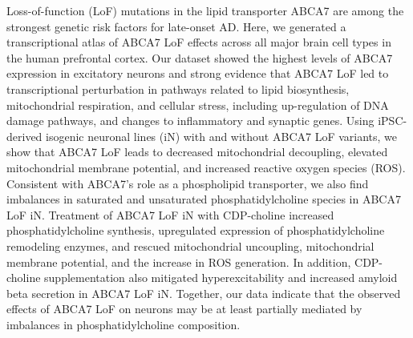 Loss-of-function (LoF) mutations in the lipid transporter ABCA7 are among the strongest genetic risk factors for late-onset AD. Here, we generated a transcriptional atlas of ABCA7 LoF effects across all major brain cell types in the human prefrontal cortex. Our dataset showed the highest levels of ABCA7 expression in excitatory neurons and strong evidence that ABCA7 LoF led to transcriptional perturbation in pathways related to lipid biosynthesis, mitochondrial respiration, and cellular stress, including up-regulation of DNA damage pathways, and changes to inflammatory and synaptic genes. Using iPSC-derived isogenic neuronal lines (iN) with and without ABCA7 LoF variants, we show that ABCA7 LoF leads to decreased mitochondrial decoupling, elevated mitochondrial membrane potential, and increased reactive oxygen species (ROS). Consistent with ABCA7’s role as a phospholipid transporter, we also find imbalances in saturated and unsaturated phosphatidylcholine species in ABCA7 LoF iN. Treatment of ABCA7 LoF iN with CDP-choline increased phosphatidylcholine synthesis, upregulated expression of phosphatidylcholine remodeling enzymes, and rescued mitochondrial uncoupling, mitochondrial membrane potential, and the increase in ROS generation. In addition, CDP-choline supplementation also mitigated hyperexcitability and increased amyloid beta secretion in ABCA7 LoF iN. Together, our data indicate that the observed effects of ABCA7 LoF on neurons may be at least partially mediated by imbalances in phosphatidylcholine composition. 


